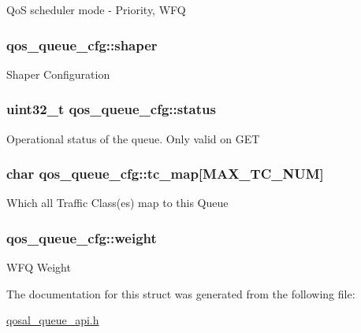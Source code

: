 Qo\-S scheduler mode -\/ Priority, W\-F\-Q \hypertarget{structqos__queue__cfg_a7dd1ff7c97cd7199ee77f331d31a541b}{
\subsubsection[{shaper}]{ qos\-\_\-queue\-\_\-cfg\-::shaper}}\label{structqos__queue__cfg_a7dd1ff7c97cd7199ee77f331d31a541b}
Shaper Configuration \hypertarget{structqos__queue__cfg_a5606d7eca82540293ea53b343f0e55c3}{
\subsubsection[{status}]{\setlength{\rightskip}{0pt plus 5cm}uint32\-\_\-t qos\-\_\-queue\-\_\-cfg\-::status}}\label{structqos__queue__cfg_a5606d7eca82540293ea53b343f0e55c3}
Operational status of the queue. Only valid on G\-E\-T \hypertarget{structqos__queue__cfg_a1571ed347d8821847dcf966c0e26d034}{
\subsubsection[{tc\-\_\-map}]{\setlength{\rightskip}{0pt plus 5cm}char qos\-\_\-queue\-\_\-cfg\-::tc\-\_\-map\mbox{[}{\bf M\-A\-X\-\_\-\-T\-C\-\_\-\-N\-U\-M}\mbox{]}}}\label{structqos__queue__cfg_a1571ed347d8821847dcf966c0e26d034}
Which all Traffic Class(es) map to this Queue \hypertarget{structqos__queue__cfg_a4a188cdf7f60a129d2909fc6335f120b}{
\subsubsection[{weight}]{ qos\-\_\-queue\-\_\-cfg\-::weight}}\label{structqos__queue__cfg_a4a188cdf7f60a129d2909fc6335f120b}
W\-F\-Q Weight 

The documentation for this struct was generated from the following file\-:\begin{DoxyCompactItemize}
\item 
\hyperlink{qosal__queue__api_8h}{qosal\-\_\-queue\-\_\-api.\-h}\end{DoxyCompactItemize}
